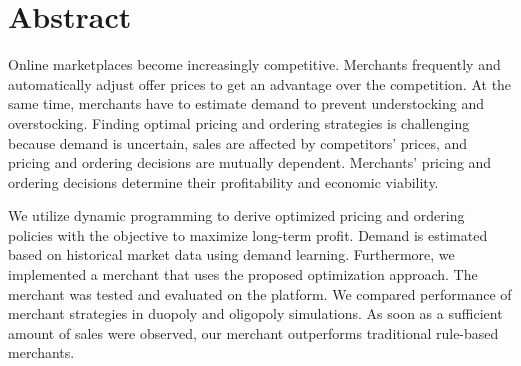 \chapter*{Abstract}
Online marketplaces become increasingly competitive.
Merchants frequently and automatically adjust offer prices to get an advantage over the competition.
At the same time, merchants have to estimate demand to prevent understocking and overstocking.
Finding optimal pricing and ordering strategies is challenging because demand is uncertain, sales are affected by competitors' prices, and pricing and ordering decisions are mutually dependent.
Merchants' pricing and ordering decisions determine their profitability and economic viability.

We utilize dynamic programming to derive optimized pricing and ordering policies with the objective to maximize long-term profit.
Demand is estimated based on historical market data using demand learning.
Furthermore, we implemented a merchant that uses the proposed optimization approach.
The merchant was tested and evaluated on the \pricewars platform.
We compared performance of merchant strategies in duopoly and oligopoly simulations.
As soon as a sufficient amount of sales were observed, our merchant outperforms traditional rule-based merchants.

